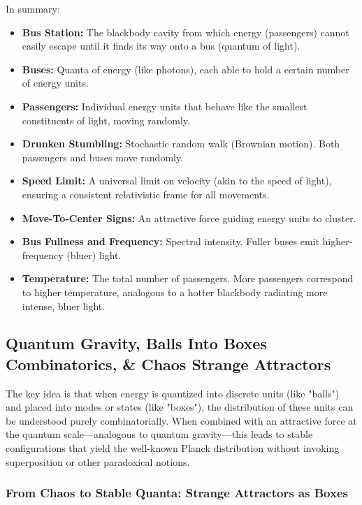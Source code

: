 \documentclass{report}
\begin{document}
In summary:
\begin{itemize}
    \item \textbf{Bus Station:} The blackbody cavity from which energy (passengers) cannot easily escape until it finds its way onto a bus (quantum of light).
    \item \textbf{Buses:} Quanta of energy (like photons), each able to hold a certain number of energy units.
    \item \textbf{Passengers:} Individual energy units that behave like the smallest constituents of light, moving randomly.
    \item \textbf{Drunken Stumbling:} Stochastic random walk (Brownian motion). Both passengers and buses move randomly.
    \item \textbf{Speed Limit:} A universal limit on velocity (akin to the speed of light), ensuring a consistent relativistic frame for all movements.
    \item \textbf{Move-To-Center Signs:} An attractive force guiding energy units to cluster.
    \item \textbf{Bus Fullness and Frequency:} Spectral intensity. Fuller buses emit higher-frequency (bluer) light.
    \item \textbf{Temperature:} The total number of passengers. More passengers correspond to higher temperature, analogous to a hotter blackbody radiating more intense, bluer light.
\end{itemize}


\subsection*{Quantum Gravity, Balls Into Boxes Combinatorics, \& Chaos Strange Attractors}

The key idea is that when energy is quantized into discrete units (like "balls") and placed into modes or states (like "boxes"), the distribution of these units can be understood purely combinatorially. When combined with an attractive force at the quantum scale—analogous to quantum gravity—this leads to stable configurations that yield the well-known Planck distribution without invoking superposition or other paradoxical notions.

\subsubsection*{From Chaos to Stable Quanta: Strange Attractors as Boxes}
\end{document}
